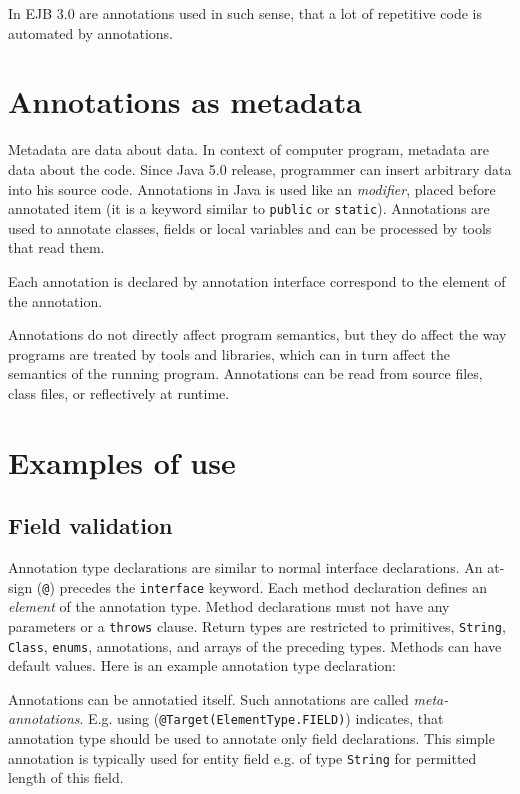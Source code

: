 \documentclass[11pt,twoside,a4paper]{book}
\begin{document}
In EJB 3.0 are annotations used in such sense, that a lot of repetitive code is
automated by annotations.

\section{Annotations as metadata}
Metadata are data about data. In context of computer program, metadata are data
about the code. Since Java 5.0 release, programmer can insert arbitrary data
into his source code. Annotations in Java is used like an \textit{modifier},
placed before annotated item (it is a keyword similar to \verb|public| or
\verb|static|). Annotations are used to annotate classes, fields or local
variables and can be processed by tools that read them.

Each annotation is declared by annotation interface correspond to the element of
the annotation.

Annotations do not directly affect program semantics, but they do affect the way
programs are treated by tools and libraries, which can in turn affect the
semantics of the running program. Annotations can be read from source files,
class files, or reflectively at runtime.

\section{Examples of use}

\subsection{Field validation}

Annotation type declarations are similar to normal interface declarations. An
at-sign (\verb|@|) precedes the \verb|interface| keyword. Each method
declaration defines an \textit{element} of the annotation type. Method
declarations must not have any parameters or a \verb|throws| clause. Return
types are restricted to primitives, \verb|String|, \verb|Class|, \verb|enums|,
annotations, and arrays of the preceding types. Methods can have default values.
Here is an example annotation type declaration:



Annotations can be annotatied itself. Such annotations are called
\textit{meta-annotations}. E.g. using
(\verb|@Target(ElementType.FIELD)|) indicates, that annotation type should
be used to annotate only field declarations.
This simple annotation is typically used for entity field e.g. of type
\verb|String| for permitted length of this field.
\end{document}
